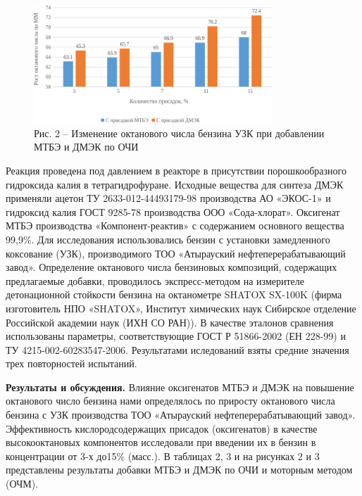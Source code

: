 \begin{figure}[H]
	\centering
	\includegraphics[width=0.8\textwidth]{media/chem/image98}
	\caption*{Рис. 2 -- Изменение октанового числа бензина УЗК при
добавлении МТБЭ и ДМЭК по ОЧИ}
\end{figure}

\begin{multicols}{2}
Реакция проведена под давлением в реакторе в присутствии
порошкообразного гидроксида калия в тетрагидрофуране. Исходные вещества
для синтеза ДМЭК применяли ацетон ТУ 2633-012-44493179-98 производства
АО «ЭКОС-1» и гидроксид калия ГОСТ 9285-78 производства ООО
«Сода-хлорат». Оксигенат МТБЭ производства «Компонент-реактив» с
содержанием основного вещества 99,9\%. Для исследования использовались
бензин с установки замедленного коксование (УЗК), производимого ТОО
«Атырауский нефтеперерабатывающий завод». Определение октанового числа
бензиновых композиций, содержащих предлагаемые добавки, проводилось
экспресс-методом на измерителе детонационной стойкости бензина на
октанометре SHATOX SX-100K (фирма изготовитель НПО «SHATOX», Институт
химических наук Сибирское отделение Российской академии наук (ИХН СО
РАН)). В качестве эталонов сравнения использованы параметры,
соответствующие ГОСТ Р 51866-2002 (ЕН 228-99) и ТУ
4215-002-60283547-2006. Результатами иследований взяты средние значения
трех повторностей испытаний.

{\bfseries Результаты и обсуждения.} Влияние оксигенатов МТБЭ и ДМЭК на
повышение октанового число бензина нами определялось по приросту
октанового числа бензина с УЗК производства ТОО «Атырауский
нефтеперерабатывающий завод». Эффективность кислородсодержащих присадок
(оксигенатов) в качестве высокооктановых компонентов исследовали при
введении их в бензин в концентрации от 3-х до15\% (масс.). В таблицах 2,
3 и на рисунках 2 и 3 представлены результаты добавки МТБЭ и ДМЭК по ОЧИ
и моторным методом (ОЧМ).
\end{multicols}

